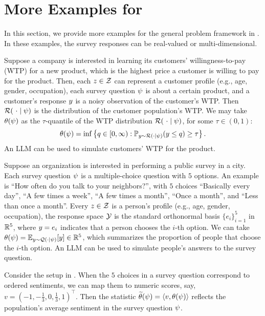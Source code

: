 \section{More Examples for }\label{sec-examples}

In this section, we provide more examples for the general problem framework in . In these examples, the survey responses can be real-valued or multi-dimensional.


\begin{example}
Suppose a company is interested in learning its customers' willingness-to-pay (WTP) for a new product, which is the highest price a customer is willing to pay for the product. Then, each $z \in \mathcal{Z}$ can represent a customer profile (e.g., age, gender, occupation), each survey question $\psi$ is about a certain product, and a customer's response $y$ is a noisy observation of the customer's WTP. Then $\mathcal{R}(~\cdot\mid \psi )$ is the distribution of the customer population's WTP. We may take $\theta (\psi)$ as the $\tau$-quantile of the WTP distribution $\mathcal{R}(~\cdot\mid \psi )$, for some $\tau\in(0,1)$:
\[
\theta (\psi) = \inf \left\{ q\in[0,\infty) : \mathbb{P}_{y \sim \mathcal{R}(\cdot\mid \psi )} (y\le q) \ge \tau \right\}.
\] 
An LLM can be used to simulate customers' WTP for the product.
\end{example}

\begin{example}\label{example-public-survey}
Suppose an organization is interested in performing a public survey in a city. Each survey question $\psi$ is a multiple-choice question with $5$ options. An example is ``How often do you talk to your neighbors?'', with $5$ choices ``Basically every day'', ``A few times a week'', ``A few times a month'', ``Once a month'', and ``Less than once a month''. Every $z \in \mathcal{Z}$ is a person's profile (e.g., age, gender, occupation), the response space $\mathcal{Y}$ is the standard orthonormal basis $\{e_i\}_{i=1}^5$ in $\mathbb{R}^5$, where $y = e_i$ indicates that a person chooses the $i$-th option. We can take $\theta ( \psi ) = \mathbb{E}_{y \sim \mathcal{Q}(\cdot\mid\psi)}[y]\in\mathbb{R}^5$, which summarizes the proportion of people that choose the $i$-th option. An LLM can be used to simulate people's answers to the survey question.
\end{example}

\begin{example}\label{example-public-survey-1D}
Consider the setup in . When the $5$ choices in a survey question correspond to ordered sentiments, we can map them to numeric scores, say, $v = (-1,-\frac{1}{3},0,\frac{1}{3},1)^\top$. Then the statistic $\widetilde{\theta} (\psi) = \langle v,\theta (\psi)  \rangle$ reflects the population's average sentiment in the survey question $\psi$.
\end{example}

